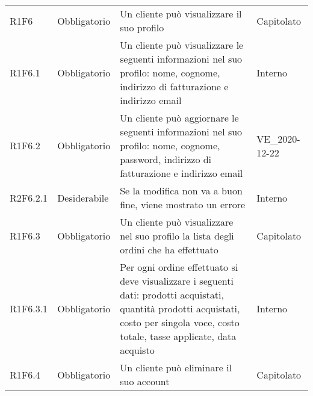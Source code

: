 {\begin{longtable}{C{2.5cm} C{2.8cm} C{6.7cm} C{2.5cm}}

R1F6 & Obbligatorio & Un cliente può visualizzare il suo profilo & Capitolato \\
R1F6.1 & Obbligatorio & Un cliente può visualizzare le seguenti informazioni nel suo profilo: nome, cognome, indirizzo di fatturazione e indirizzo email & Interno \\
R1F6.2 & Obbligatorio & Un cliente può aggiornare le seguenti informazioni nel suo profilo: nome, cognome, password, indirizzo di fatturazione e indirizzo email & VE\_2020-12-22 \\
R2F6.2.1 & Desiderabile & Se la modifica non va a buon fine, viene mostrato un errore & Interno \\
R1F6.3 & Obbligatorio & Un cliente può visualizzare nel suo profilo la lista degli ordini che ha effettuato & Capitolato \\
R1F6.3.1 & Obbligatorio & Per ogni ordine effettuato si deve visualizzare i seguenti dati: prodotti acquistati, quantità prodotti acquistati, costo per singola voce, costo totale, tasse applicate, data acquisto & Interno \\
R1F6.4 & Obbligatorio & Un cliente può eliminare il suo account & Capitolato \\



\end{longtable}}
